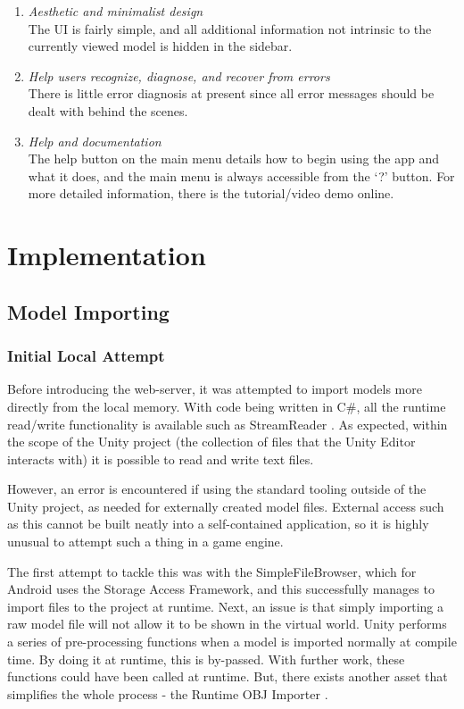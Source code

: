 \documentclass[12pt, a4paper]{article}
\begin{document}
\begin{enumerate}
    \item \textit{Aesthetic and minimalist design} \\
    The UI is fairly simple, and all additional information not intrinsic to the currently viewed model is hidden in the sidebar.
    \item \textit{Help users recognize, diagnose, and recover from errors} \\
    There is little error diagnosis at present since all error messages should be dealt with behind the scenes.
    \item \textit{Help and documentation} \\
    The help button on the main menu details how to begin using the app and what it does, and the main menu is always accessible from the `?' button. For more detailed information, there is the tutorial/video demo online. \cite{design:videodemo}
\end{enumerate}

\section{Implementation}
\label{implementation}

\subsection{Model Importing}
\label{modelimporting}

\subsubsection{Initial Local Attempt}
\label{initiallocalattempt}
Before introducing the web-server, it was attempted to import models more directly from the local memory. With code being written in C\#, all the runtime read/write functionality is available such as StreamReader \cite{models:streamreader}. As expected, within the scope of the Unity project (the collection of files that the Unity Editor interacts with) it is possible to read and write text files.

However, an error is encountered if using the standard tooling outside of the Unity project, as needed for externally created model files. External access such as this cannot be built neatly into a self-contained application, so it is highly unusual to attempt such a thing in a game engine. 

The first attempt to tackle this was with the SimpleFileBrowser, which for Android uses the Storage Access Framework, and this successfully manages to import files to the project at runtime. Next, an issue is that simply importing a raw model file will not allow it to be shown in the virtual world. Unity performs a series of pre-processing functions when a model is imported normally at compile time. By doing it at runtime, this is by-passed. With further work, these functions could have been called at runtime. But, there exists another asset that simplifies the whole process - the Runtime OBJ Importer \cite{models:objimporter}.
\end{document}
